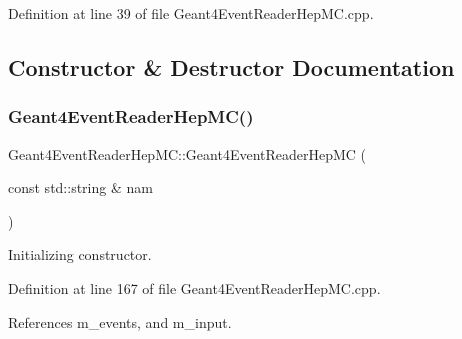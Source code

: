 Definition at line 39 of file Geant4\+Event\+Reader\+Hep\+M\+C.\+cpp.



\subsection{Constructor \& Destructor Documentation}
\hypertarget{class_d_d4hep_1_1_simulation_1_1_geant4_event_reader_hep_m_c_a265a4a6251eb9980a3a76e413c643f0c}{}\label{class_d_d4hep_1_1_simulation_1_1_geant4_event_reader_hep_m_c_a265a4a6251eb9980a3a76e413c643f0c} 
\subsubsection{\texorpdfstring{Geant4\+Event\+Reader\+Hep\+M\+C()}{Geant4EventReaderHepMC()}}
{\footnotesize\ttfamily Geant4\+Event\+Reader\+Hep\+M\+C\+::\+Geant4\+Event\+Reader\+Hep\+MC (\begin{DoxyParamCaption}\item[{const std\+::string \&}]{nam }\end{DoxyParamCaption})\hspace{0.3cm}{\ttfamily [explicit]}}



Initializing constructor. 



Definition at line 167 of file Geant4\+Event\+Reader\+Hep\+M\+C.\+cpp.



References m\+\_\+events, and m\+\_\+input.

\hypertarget{class_d_d4hep_1_1_simulation_1_1_geant4_event_reader_hep_m_c_a437c86083e7da05be4821da864d8954a}{}\label{class_d_d4hep_1_1_simulation_1_1_geant4_event_reader_hep_m_c_a437c86083e7da05be4821da864d8954a} 
